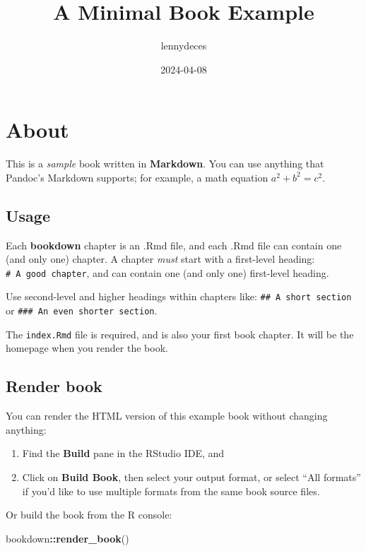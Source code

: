 \documentclass[
]{book}
\title{A Minimal Book Example}
\author{lennydeces}
\date{2024-04-08}
\newenvironment{Shaded}{\begin{snugshade}}{\end{snugshade}}
\newcommand{\FunctionTok}[1]{\textcolor[rgb]{0.13,0.29,0.53}{\textbf{#1}}}
\newcommand{\NormalTok}[1]{#1}
\newcommand{\SpecialCharTok}[1]{\textcolor[rgb]{0.81,0.36,0.00}{\textbf{#1}}}
\begin{document}
\maketitle

{
\setcounter{tocdepth}{1}
\tableofcontents
}
\hypertarget{about}{%
\chapter{About}\label{about}}

This is a \emph{sample} book written in \textbf{Markdown}. You can use anything that Pandoc's Markdown supports; for example, a math equation \(a^2 + b^2 = c^2\).

\hypertarget{usage}{%
\section{Usage}\label{usage}}

Each \textbf{bookdown} chapter is an .Rmd file, and each .Rmd file can contain one (and only one) chapter. A chapter \emph{must} start with a first-level heading: \texttt{\#\ A\ good\ chapter}, and can contain one (and only one) first-level heading.

Use second-level and higher headings within chapters like: \texttt{\#\#\ A\ short\ section} or \texttt{\#\#\#\ An\ even\ shorter\ section}.

The \texttt{index.Rmd} file is required, and is also your first book chapter. It will be the homepage when you render the book.

\hypertarget{render-book}{%
\section{Render book}\label{render-book}}

You can render the HTML version of this example book without changing anything:

\begin{enumerate}
\def\labelenumi{\arabic{enumi}.}
\item
  Find the \textbf{Build} pane in the RStudio IDE, and
\item
  Click on \textbf{Build Book}, then select your output format, or select ``All formats'' if you'd like to use multiple formats from the same book source files.
\end{enumerate}

Or build the book from the R console:

\begin{Shaded}
\begin{Highlighting}[]
\NormalTok{bookdown}\SpecialCharTok{::}\FunctionTok{render\_book}\NormalTok{()}
\end{Highlighting}
\end{Shaded}
\end{document}
